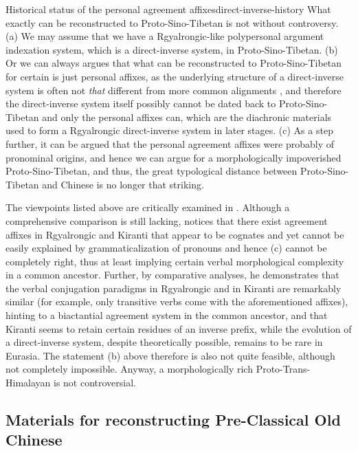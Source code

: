 \documentclass[UTF8, a4paper, oneside, scheme=plain, 12pt]{ctexrep}
\begin{document}
\begin{infobox}{Historical status of the personal agreement affixes}{direct-inverse-history}
    What exactly can be reconstructed to Proto-Sino-Tibetan is not without controversy.
    (a) We may assume that we have a Rgyalrongic-like polypersonal argument indexation system, which is a direct-inverse system, in Proto-Sino-Tibetan.
    (b) Or we can always argues that
    what can be reconstructed to Proto-Sino-Tibetan for certain is just personal affixes,
    as the underlying structure of a direct-inverse system is often not \emph{that}
    different from more common alignments \citep{oxford2017inverse},
    and therefore the direct-inverse system itself possibly cannot be dated back to Proto-Sino-Tibetan
    and only the personal affixes can,
    which are the diachronic materials used to form a Rgyalrongic direct-inverse system in later stages.
    (c) As a step further, it can be argued that the personal agreement affixes
    were probably of pronominal origins, 
    and hence we can argue for a morphologically impoverished Proto-Sino-Tibetan,
    and thus, the great typological distance between Proto-Sino-Tibetan and Chinese is no longer that striking.

    The viewpoints listed above are critically examined in \citet{jacques2012agreement}.
    Although a comprehensive comparison is still lacking,
    \citeauthor{jacques2012agreement} notices that 
    there exist agreement affixes in Rgyalrongic and Kiranti that appear to be cognates and yet cannot be easily explained by grammaticalization of pronouns and hence (c) cannot be completely right,
    thus at least implying certain verbal morphological complexity in a common ancestor.
    Further, by comparative analyses,
    he demonstrates that the verbal conjugation paradigms in Rgyalrongic and in Kiranti are remarkably similar
    (for example, only transitive verbs come with the aforementioned affixes),
    hinting to a biactantial agreement system in the common ancestor, and 
    that Kiranti seems to retain certain residues of an inverse prefix,
    while the evolution of a direct-inverse system, despite theoretically possible,
    remains to be rare in Eurasia.
    The statement (b) above therefore is also not quite feasible, although not completely impossible.
    Anyway, a morphologically rich Proto-Trans-Himalayan is not controversial.
\end{infobox}

\subsection{Materials for reconstructing Pre-Classical Old Chinese}\label{sec:intro-pre-classical}
\end{document}

